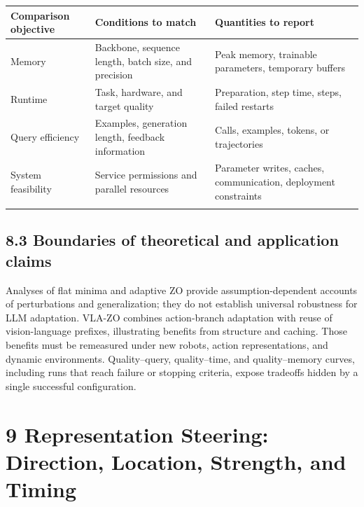 \begingroup\small\setlength{\tabcolsep}{5pt}\renewcommand{\arraystretch}{1.18}

\begin{longtable}{>{\raggedright\arraybackslash}p{4.85cm}>{\raggedright\arraybackslash}p{4.85cm}>{\raggedright\arraybackslash}p{4.85cm}}

\toprule

\textbf{Comparison objective} & \textbf{Conditions to match} & \textbf{Quantities to report}\\\midrule\endhead

Memory & Backbone, sequence length, batch size, and precision & Peak memory, trainable parameters, temporary buffers\\\addlinespace[3pt]

Runtime & Task, hardware, and target quality & Preparation, step time, steps, failed restarts\\\addlinespace[3pt]

Query efficiency & Examples, generation length, feedback information & Calls, examples, tokens, or trajectories\\\addlinespace[3pt]

System feasibility & Service permissions and parallel resources & Parameter writes, caches, communication, deployment constraints\\\addlinespace[3pt]

\bottomrule\end{longtable}\endgroup

\subsection*{8.3 Boundaries of theoretical and application claims}

Analyses of flat minima and adaptive ZO provide assumption-dependent accounts of perturbations and generalization; they do not establish universal robustness for LLM adaptation.\cite{r77,r79} VLA-ZO combines action-branch adaptation with reuse of vision-language prefixes, illustrating benefits from structure and caching.\cite{r83} Those benefits must be remeasured under new robots, action representations, and dynamic environments. Quality–query, quality–time, and quality–memory curves, including runs that reach failure or stopping criteria, expose tradeoffs hidden by a single successful configuration.


\section*{9 Representation Steering: Direction, Location, Strength, and Timing}

